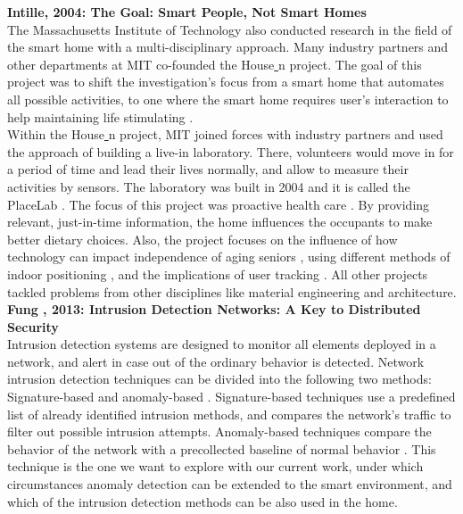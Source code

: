 
\textbf{Intille, 2004: The Goal: Smart People, Not Smart Homes} \cite{smartpeople} \\
The Massachusetts Institute of Technology also conducted research in the field of the smart home with a multi-disciplinary approach. Many industry partners and other departments at MIT co-founded the House\underline{ }n project. The goal of this project \cite{smartpeople} was to shift the investigation's focus from a smart home that automates all possible activities, to one where the smart home requires user's interaction to help maintaining life stimulating \cite{smartpeople}.\\
Within the House\underline{ }n project, MIT joined forces with industry partners and used the approach of building a live-in laboratory. There, volunteers would move in for a period of time and lead their lives normally, and allow to measure their activities by sensors. The laboratory was built in 2004 and it is called the PlaceLab \cite{placelab}. 
The focus of this project was proactive health care \cite{placelab}. By providing relevant, just-in-time information, the home influences the occupants to make better dietary choices. Also, the project focuses on the influence of how technology can impact independence of aging seniors \cite{aginginplace}, using different methods of indoor positioning \cite{bhack}, and the implications of user tracking \cite{info:doi/10.2196/jmir.8.4.e29}. All other projects tackled problems from other disciplines like material engineering and architecture.\\

\textbf{Fung \etAl, 2013: Intrusion Detection Networks: A Key to Distributed Security} \cite{fung2013CRC} \\
Intrusion detection systems are designed to monitor all elements deployed in a network, and alert in case out of the ordinary behavior is detected. Network intrusion detection techniques can be divided into the following two methods: Signature-based and anomaly-based \cite{fung2013CRC}. Signature-based techniques use a predefined list of already identified intrusion methods, and compares the network's traffic to filter out possible intrusion attempts. Anomaly-based techniques compare the behavior of the network with a precollected baseline of normal behavior \cite{fung2013CRC}. This technique is the one we want to explore with our current work, under which circumstances anomaly detection can be extended to the smart environment, and which of the intrusion detection methods can be also used in the home.\\
 
